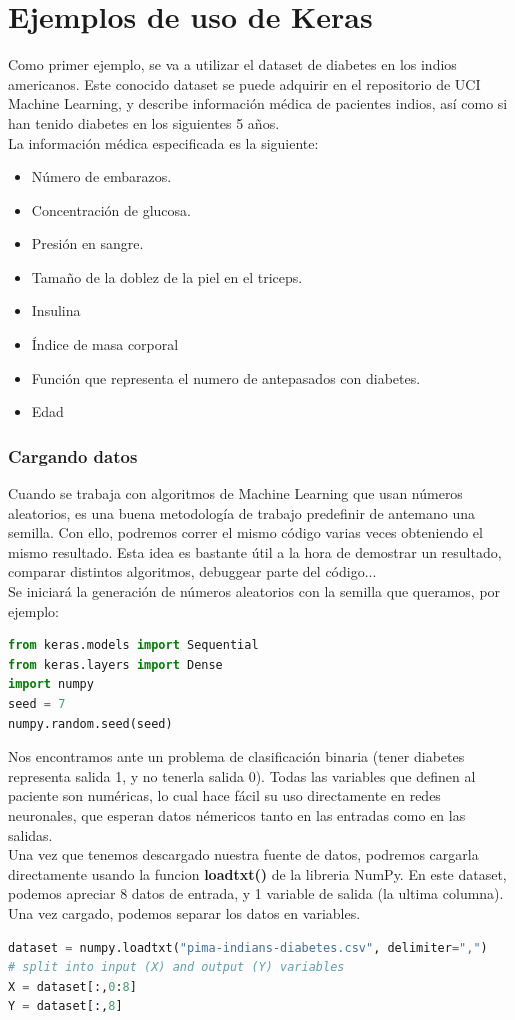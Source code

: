 \chapter{Ejemplos de uso de Keras}
Como primer ejemplo, se va a utilizar el dataset de diabetes en los indios americanos. Este conocido dataset se puede adquirir en el repositorio de UCI Machine Learning, y describe información médica de pacientes indios, así como si han tenido diabetes en los siguientes 5 años.\\
La información médica especificada es la siguiente:
\begin{itemize}[noitemsep]
\item Número de embarazos.
\item Concentración de glucosa.
\item Presión en sangre.
\item Tamaño de la doblez de la piel en el triceps.
\item Insulina
\item Índice de masa corporal
\item Función que representa el numero de antepasados con diabetes.
\item Edad
\end{itemize}
\subsection{Cargando datos}

Cuando se trabaja con algoritmos de Machine Learning que usan números aleatorios, es una buena metodología de trabajo predefinir de antemano una semilla. Con ello, podremos correr el mismo código varias veces obteniendo el mismo resultado. Esta idea es bastante útil a la hora de demostrar un resultado, comparar distintos algoritmos, debuggear parte del código...\\
Se iniciará la generación de números aleatorios con la semilla que queramos, por ejemplo:
\begin{lstlisting}[language=Python]
from keras.models import Sequential
from keras.layers import Dense
import numpy
seed = 7
numpy.random.seed(seed)
\end{lstlisting}
Nos encontramos ante un problema de clasificación binaria (tener diabetes representa salida 1, y no tenerla salida 0). Todas las variables que definen al paciente son numéricas, lo cual hace fácil su uso directamente en redes neuronales, que esperan datos némericos tanto en las entradas como en las salidas.\\
Una vez que tenemos descargado nuestra fuente de datos, podremos cargarla directamente usando la funcion \textbf{loadtxt()} de la libreria NumPy. En este dataset, podemos apreciar 8 datos de entrada, y 1 variable de salida (la ultima columna). Una vez cargado, podemos separar los datos en variables.
\begin{lstlisting}[language=Python]
dataset = numpy.loadtxt("pima-indians-diabetes.csv", delimiter=",")
# split into input (X) and output (Y) variables
X = dataset[:,0:8]
Y = dataset[:,8]
\end{lstlisting}

